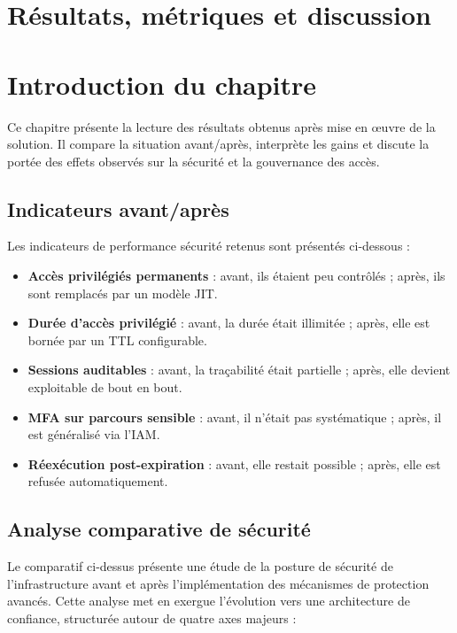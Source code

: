 \section{Résultats, métriques et discussion}

\section{Introduction du chapitre}
Ce chapitre présente la lecture des résultats obtenus après mise en œuvre de la solution. Il compare la situation avant/après, interprète les gains et discute la portée des effets observés sur la sécurité et la gouvernance des accès.

\subsection{Indicateurs avant/après}
Les indicateurs de performance sécurité retenus sont présentés ci-dessous :
\begin{itemize}
    \item \textbf{Accès privilégiés permanents} : avant, ils étaient peu contrôlés ; après, ils sont remplacés par un modèle JIT.
    \item \textbf{Durée d'accès privilégié} : avant, la durée était illimitée ; après, elle est bornée par un TTL configurable.
    \item \textbf{Sessions auditables} : avant, la traçabilité était partielle ; après, elle devient exploitable de bout en bout.
    \item \textbf{MFA sur parcours sensible} : avant, il n'était pas systématique ; après, il est généralisé via l'IAM.
    \item \textbf{Réexécution post-expiration} : avant, elle restait possible ; après, elle est refusée automatiquement.
\end{itemize}

\subsection{Analyse comparative de sécurité}

Le comparatif ci-dessus présente une étude de la posture de sécurité de l'infrastructure avant et après l'implémentation des mécanismes de protection avancés. Cette analyse met en exergue l'évolution vers une architecture de confiance, structurée autour de quatre axes majeurs :

